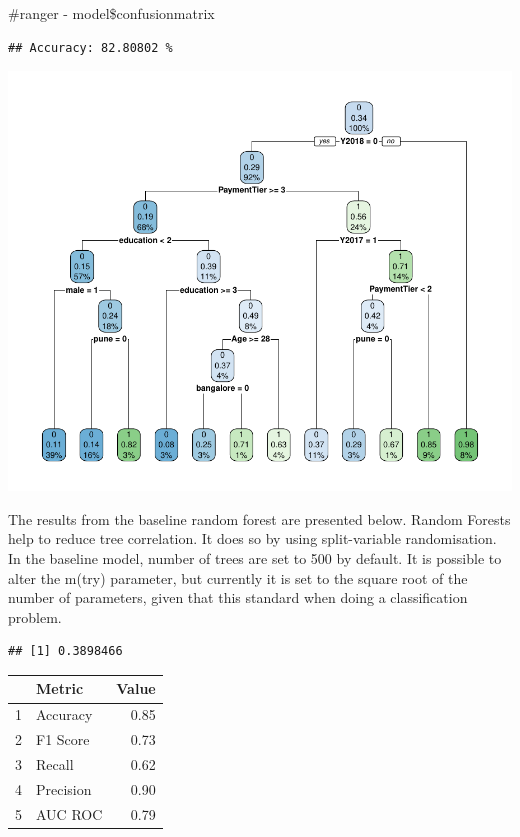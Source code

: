 \documentclass[11pt,preprint, authoryear]{elsarticle}
\let\origtable\table
\let\endorigtable\endtable
\renewenvironment{table}[1][2] {
    \expandafter\origtable\expandafter[H]
} {
    \endorigtable
}
\numberwithin{equation}{section}
\numberwithin{figure}{section}
\numberwithin{table}{section}
\begin{document}
\#ranger - model\$confusionmatrix

\begin{verbatim}
## Accuracy: 82.80802 %
\end{verbatim}

\includegraphics{Final_project_files/figure-latex/unnamed-chunk-9-1.pdf}

The results from the baseline random forest are presented below. Random
Forests help to reduce tree correlation. It does so by using
split-variable randomisation. In the baseline model, number of trees are
set to 500 by default. It is possible to alter the m(try) parameter, but
currently it is set to the square root of the number of parameters,
given that this standard when doing a classification problem.

\begin{verbatim}
## [1] 0.3898466
\end{verbatim}

\begin{table}[H]
\centering
\begin{tabular}{rlr}
  \hline
 & Metric & Value \\ 
  \hline
1 & Accuracy & 0.85 \\ 
  2 & F1 Score & 0.73 \\ 
  3 & Recall & 0.62 \\ 
  4 & Precision & 0.90 \\ 
  5 & AUC ROC & 0.79 \\ 
   \hline
\end{tabular}
\caption{Metrics for Baseline Random Forest \label{tab1}} 
\end{table}
\end{document}
